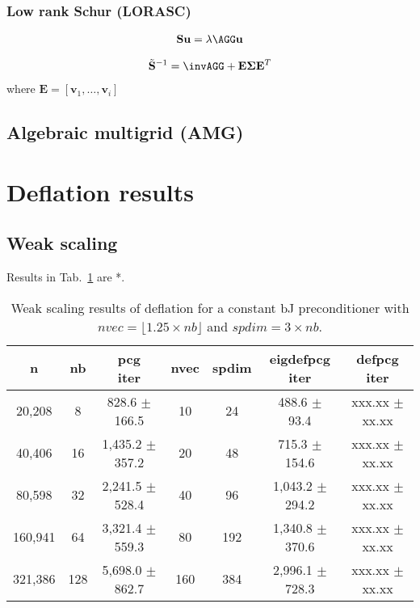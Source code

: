 \documentclass{article}
\begin{document}
\subsubsection{Low rank Schur (LORASC)}

\begin{align}
\mathbf{S}\mathbf{u}=\lambda\AGG\mathbf{u}
\end{align}

\begin{align}
\tilde{\mathbf{S}}^{-1}=\invAGG+\mathbf{E}\boldsymbol{\Sigma}\mathbf{E}^T
\end{align}
where $\mathbf{E}=[\mathbf{v}_1,\dots,\mathbf{v}_i]$

\subsection{Algebraic multigrid (AMG)}

\section{Deflation results}

\subsection{Weak scaling}
Results in Tab.~\ref{Tab:005} are *.





\begin{table}[ht]
	\caption{Weak scaling results of deflation for a constant bJ preconditioner with $nvec=\lfloor1.25\times nb\rfloor$ and $spdim=3\times nb$.}
	\centering
	\begin{tabular}{|c|c|c|c|c|c|c|}
		\hline
		n & nb & \makecell{pcg\\ iter} & nvec & spdim & \makecell{eigdefpcg\\ iter} & \makecell{defpcg\\ iter}\\
		\hline
		20,208  &   8 &   828.6 $\pm$ 166.5 &  10 &  24 &   488.6 $\pm$  93.4 & xxx.xx $\pm$ xx.xx \\
		40,406  &  16 & 1,435.2 $\pm$ 357.2 &  20 &  48 &   715.3 $\pm$ 154.6 & xxx.xx $\pm$ xx.xx \\
		80,598  &  32 & 2,241.5 $\pm$ 528.4 &  40 &  96 & 1,043.2 $\pm$ 294.2 & xxx.xx $\pm$ xx.xx \\
		160,941 &  64 & 3,321.4 $\pm$ 559.3 &  80 & 192 & 1,340.8 $\pm$ 370.6 & xxx.xx $\pm$ xx.xx \\
		321,386 & 128 & 5,698.0 $\pm$ 862.7 & 160 & 384 & 2,996.1 $\pm$ 728.3 & xxx.xx $\pm$ xx.xx \\
		\hline
	\end{tabular}
	\label{Tab:005}
\end{table}
\end{document}
